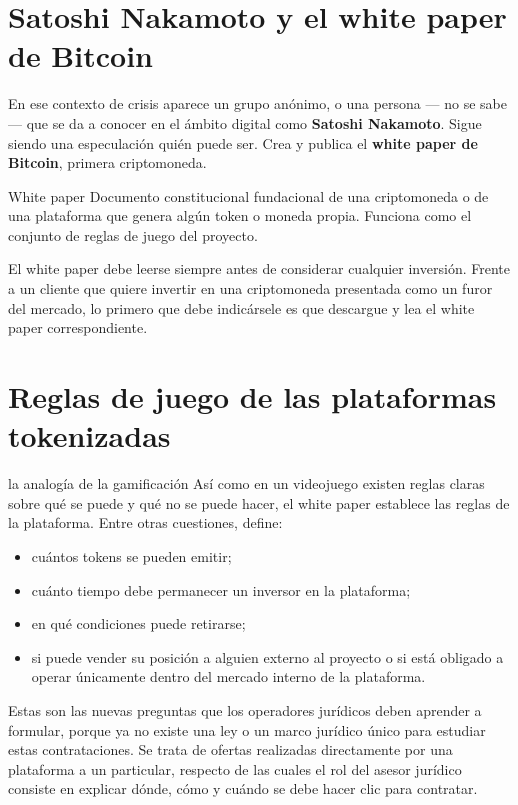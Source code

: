 \documentclass[12pt,oneside]{book}
\begin{document}
\section{Satoshi Nakamoto y el white paper de Bitcoin}

En ese contexto de crisis aparece un grupo anónimo, o una persona --- no se sabe --- que se da a conocer en el ámbito digital como \textbf{Satoshi Nakamoto}. Sigue siendo una especulación quién puede ser. Crea y publica el \textbf{white paper de Bitcoin}, primera criptomoneda.

\begin{definition}{White paper}
Documento constitucional fundacional de una criptomoneda o de una plataforma que genera algún token o moneda propia. Funciona como el conjunto de reglas de juego del proyecto.
\end{definition}

\begin{important}
El white paper debe leerse siempre antes de considerar cualquier inversión. Frente a un cliente que quiere invertir en una criptomoneda presentada como un furor del mercado, lo primero que debe indicársele es que descargue y lea el white paper correspondiente.
\end{important}

\section{Reglas de juego de las plataformas tokenizadas}

\begin{example}{la analogía de la gamificación}
Así como en un videojuego existen reglas claras sobre qué se puede y qué no se puede hacer, el white paper establece las reglas de la plataforma. Entre otras cuestiones, define:

\begin{itemize}
    \item cuántos tokens se pueden emitir;
    \item cuánto tiempo debe permanecer un inversor en la plataforma;
    \item en qué condiciones puede retirarse;
    \item si puede vender su posición a alguien externo al proyecto o si está obligado a operar únicamente dentro del mercado interno de la plataforma.
\end{itemize}
\end{example}

Estas son las nuevas preguntas que los operadores jurídicos deben aprender a formular, porque ya no existe una ley o un marco jurídico único para estudiar estas contrataciones. Se trata de ofertas realizadas directamente por una plataforma a un particular, respecto de las cuales el rol del asesor jurídico consiste en explicar dónde, cómo y cuándo se debe hacer clic para contratar.
\end{document}
